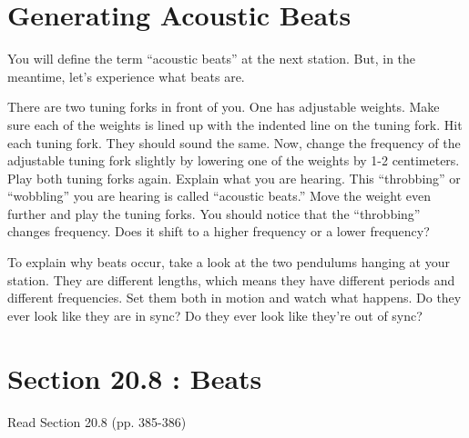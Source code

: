 \documentclass[10pt]{exam}
\begin{document}
\section{Generating Acoustic Beats}

  You will define the term ``acoustic beats'' at the next station.  But, in the meantime, let's experience what beats are.

  \begin{questions}
    \question
      There are two tuning forks in front of you.  One has adjustable weights.  Make sure each of the weights is lined up with the indented line on the tuning fork.  Hit each tuning fork.  They should sound the same.
    \question
      Now, change the frequency of the adjustable tuning fork slightly by lowering one of the weights by 1-2 centimeters.  Play both tuning forks again.  Explain what you are hearing.  
    \question
      This ``throbbing'' or ``wobbling'' you are hearing is called ``acoustic beats.'' Move the weight even further and play the tuning forks.  You should notice that the ``throbbing'' changes frequency.  Does it shift to a higher frequency or a lower frequency?

    \question
      To explain why beats occur, take a look at the two pendulums hanging at your station.  They are different lengths, which means they have different periods and different frequencies.  Set them both in motion and watch what happens.  Do they ever look like they are in sync?  Do they ever look like they're out of sync?
  \end{questions}
 
\section{Section 20.8 : Beats}

Read Section 20.8 (pp. 385-386)
\end{document}
